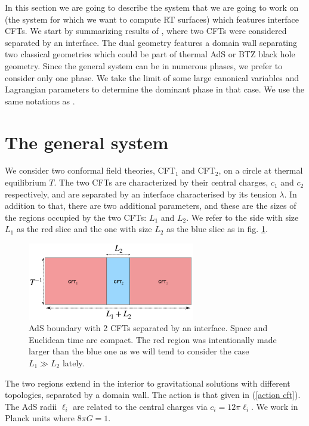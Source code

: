 In this section we are going to describe the system that we are going to work on (the system for which we want to compute RT surfaces) which features interface CFTs. We start by summarizing results of \cite{Bachas_2021}, where two CFTs were considered separated by an interface. The dual geometry features a domain wall separating two classical geometries which could be part of thermal AdS or BTZ black hole geometry. Since the general system can be in numerous phases, we prefer to consider only one phase. We take the limit of some large canonical variables and Lagrangian parameters to determine the dominant phase in that case. We use the same notations as \cite{Bachas_2021}.

\section{The general system}\label{general system}

We consider two conformal field theories, CFT$_1$ and CFT$_2$, on a circle at thermal equilibrium $T$. The two CFTs are characterized by their central charges, $c_1$ and $c_2$ respectively, and are separated by an interface characterised by its tension $\lambda$. In addition to that, there are two additional parameters, and these are the sizes of the regions occupied by the two CFTs: $L_1$ and $L_2$. We refer to the side with size $L_1$ as the red slice and the one with size $L_2$ as the blue slice as in fig. \ref{ICFT}.

\begin{figure}[h!]
    \centering
    \includegraphics[width=0.65\textwidth]{figures/ICFTb.png}
    \caption{AdS boundary with 2 CFTs separated by an interface. Space and Euclidean time are compact. The red region was intentionally made larger than the blue one as we will tend to consider the case $L_1\gg L_2$ lately.}
    \label{ICFT}
\end{figure}

The two regions extend in the interior to gravitational solutions with different topologies, separated by a domain wall. The action is that given in (\ref{action cft}). The AdS radii $\ell_i$ are related to the central charges via $c_i = 12\pi\ell_i$. We work in Planck units where $8\pi G = 1$.

